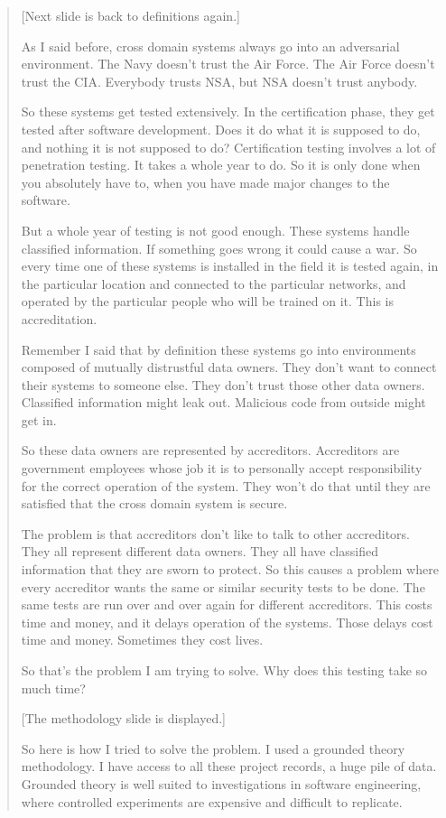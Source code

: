 \begin{quotation}
[Next slide is back to definitions again.]

As I said before, cross domain systems always go into an adversarial environment.  The Navy doesn't
trust the Air Force.  The Air Force doesn't trust the CIA.  Everybody trusts NSA, but NSA doesn't
trust anybody.

So these systems get tested extensively.  In the certification phase, they get tested after
software development.  Does it do what it is supposed to do, and nothing it is not supposed to do?
Certification testing involves a lot of penetration testing.  It takes a whole year to do.  So it
is only done when you absolutely have to, when you have made major changes to the software.

But a whole year of testing is not good enough.  These systems handle classified information.  If
something goes wrong it could cause a war.  So every time one of these systems is installed in the
field it is tested again, in the particular location and connected to the particular networks, and
operated by the particular people who will be trained on it.  This is accreditation.

Remember I said that by definition these systems go into environments composed of mutually
distrustful data owners.  They don't want to connect their systems to someone else.  They don't
trust those other data owners.  Classified information might leak out.  Malicious code from outside
might get in.

So these data owners are represented by accreditors.  Accreditors are government employees whose
job it is to personally accept responsibility for the correct operation of the system.  They won't
do that until they are satisfied that the cross domain system is secure.

The problem is that accreditors don't like to talk to other accreditors.  They all represent
different data owners.  They all have classified information that they are sworn to protect.  So
this causes a problem where every accreditor wants the same or similar security tests to be done.
The same tests are run over and over again for different accreditors.  This costs time and money,
and it delays operation of the systems.  Those delays cost time and money.  Sometimes they cost
lives.

So that's the problem I am trying to solve.  Why does this testing take so much time?

[The methodology slide is displayed.]

So here is how I tried to solve the problem.  I used a grounded theory methodology.  I have access
to all these project records, a huge pile of data.  Grounded theory is well suited to
investigations in software engineering, where controlled experiments are expensive and difficult to
replicate.


\end{quotation}

